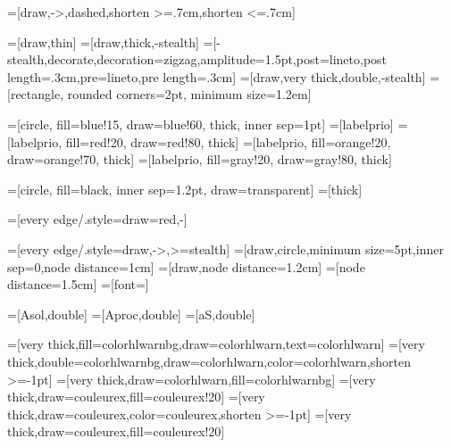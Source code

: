 =[draw,->,dashed,shorten >=.7cm,shorten <=.7cm]

=[draw,thin]%
=[draw,thick,-stealth]
=[-stealth,decorate,decoration={zigzag,amplitude=1.5pt,post=lineto,post length=.3cm,pre=lineto,pre length=.3cm}]
=[draw,very thick,double,-stealth]
=[rectangle, rounded corners=2pt, minimum size=1.2em]


=[circle, fill=blue!15, draw=blue!60, thick, inner sep=1pt]
=[labelprio]
=[labelprio, fill=red!20, draw=red!80, thick]
=[labelprio, fill=orange!20, draw=orange!70, thick]
=[labelprio, fill=gray!20, draw=gray!80, thick]

=[circle, fill=black, inner sep=1.2pt, draw=transparent]
=[thick]

=[every edge/.style={draw=red,-}]

=[every edge/.style={draw,->,>=stealth}]
=[draw,circle,minimum size=5pt,inner sep=0,node distance=1cm]
=[draw,node distance=1.2cm]
=[node distance=1.5cm]
=[font=\Large]

=[Asol,double]
=[Aproc,double]
=[aS,double]

=[very thick,fill=colorhlwarnbg,draw=colorhlwarn,text=colorhlwarn]
=[very thick,double=colorhlwarnbg,draw=colorhlwarn,color=colorhlwarn,shorten >=-1pt]
=[very thick,draw=colorhlwarn,fill=colorhlwarnbg]
=[very thick,draw=couleurex,fill=couleurex!20]
=[very thick,draw=couleurex,color=couleurex,shorten >=-1pt]
=[very thick,draw=couleurex,fill=couleurex!20]







